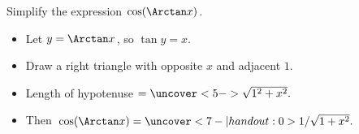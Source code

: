 \begin{frame}
\begin{example} %
Simplify the expression $\cos (\Arctan x)$.
\begin{itemize}
\item<2->  Let $y = \Arctan x$, so $\tan y = x$.
\item<3->  Draw a right triangle with opposite $x$ and adjacent $1$.
\item<4->  \alert<handout:0| 4-5>{Length of hypotenuse $ = \uncover<5->{\sqrt{1^2+x^2}.}$}
\item<6->  Then \alert<handout:0| 6-7>{$\cos (\Arctan x) = \uncover<7-| handout:0>{1/\sqrt{1+x^2}.}$}
\end{itemize}
\ %
%
%
\end{example}
\end{frame}
